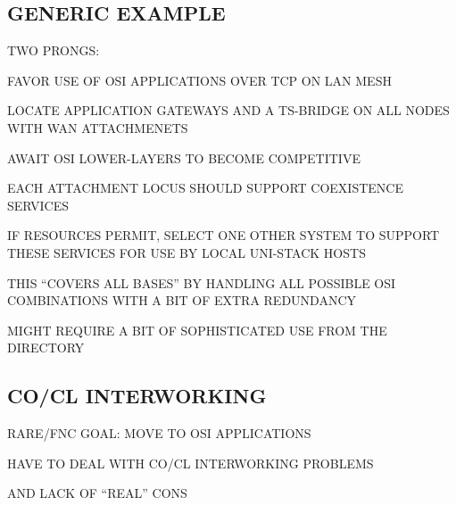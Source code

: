 \begin{bwslide}
\part*	{GENERIC EXAMPLE}\bf

\begin{nrtc}
\item	TWO PRONGS:
    \begin{nrtc}
    \item	FAVOR USE OF OSI APPLICATIONS OVER TCP ON LAN MESH

    \item	LOCATE APPLICATION GATEWAYS AND A TS-BRIDGE ON ALL NODES
		WITH WAN ATTACHMENETS
    \end{nrtc}

\item	AWAIT OSI LOWER-LAYERS TO BECOME COMPETITIVE
\end{nrtc}
\end{bwslide}


\begin{bwslide}

\begin{nrtc}
\item	EACH ATTACHMENT LOCUS SHOULD SUPPORT COEXISTENCE SERVICES

\item	IF RESOURCES PERMIT, SELECT ONE OTHER SYSTEM TO SUPPORT THESE
	SERVICES FOR USE BY LOCAL UNI-STACK HOSTS

\item	THIS ``COVERS ALL BASES'' BY HANDLING ALL POSSIBLE OSI COMBINATIONS
	WITH A BIT OF EXTRA REDUNDANCY

\item	MIGHT REQUIRE A BIT OF SOPHISTICATED USE FROM THE DIRECTORY
\end{nrtc}
\end{bwslide}




\begin{bwslide}
\part*	{CO/CL INTERWORKING}\bf

\begin{nrtc}
\item	RARE/FNC GOAL: MOVE TO OSI APPLICATIONS

\item	HAVE TO DEAL WITH CO/CL INTERWORKING PROBLEMS
    \begin{nrtc}
    \item	AND LACK OF ``REAL'' CONS
    \end{nrtc}
\end{nrtc}
\end{bwslide}


